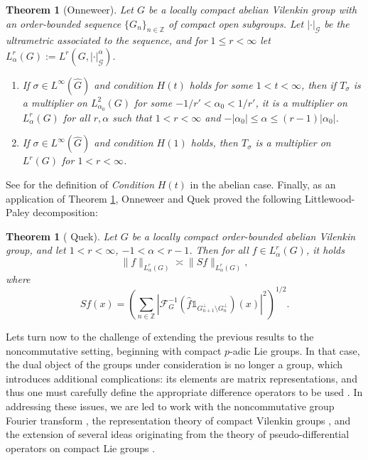 \documentclass[12pt, reqno]{amsart}
\newtheorem{teo}[defi]{Theorem}
\newcommand{\1}{\mathds{1}}
\begin{document}
\begin{teo}[Onneweer]\label{teomiltionnewer}
Let $G$ be a locally compact abelian Vilenkin group with an order-bounded sequence $\{G_n\}_{n \in \mathbb{Z}}$ of compact open subgroups. Let $|\cdot|_{\mathcal{G}}$ be the ultrametric associated to the sequence, and for $1 \le r < \infty$ let $L^r_\alpha(G) := L^r(G, |\cdot|^\alpha_{\mathcal{G}})$.
\begin{enumerate}
    \item If $\sigma \in L^\infty(\hat{G})$ and condition $H(t)$ holds for some $1 < t < \infty$, then if $T_\sigma$ is a multiplier on $L^2_{\alpha_0}(G)$ for some $-1/r' < \alpha_0 < 1/r'$, it is a multiplier on $L^r_\alpha(G)$ for all $r, \alpha$ such that $1 < r < \infty$ and $-|\alpha_0| \le \alpha \le (r-1)|\alpha_0|$.
    \item If $\sigma \in L^\infty(\hat{G})$ and condition $H(1)$ holds, then $T_\sigma$ is a multiplier on $L^r(G)$ for $1 < r < \infty$.
\end{enumerate}
\end{teo}

See \cite{Onneweer1985} for the definition of \emph{Condition} $H(t)$ in the abelian case. Finally, as an application of Theorem \ref{teomiltionnewer}, Onneweer and Quek proved the following Littlewood-Paley decomposition:

\begin{teo}[ Quek]
Let $G$ be a locally compact order-bounded abelian Vilenkin group, and let $1 < r < \infty$, $-1 < \alpha < r-1$. Then for all $f \in L^r_\alpha(G)$, it holds
\[
\|f\|_{L^r_\alpha(G)} \asymp \|S f\|_{L^r_\alpha(G)},
\]
where
\[
S f(x) = \left( \sum_{n \in \mathbb{Z}} |\mathcal{F}_G^{-1}(\widehat{f} \mathbb{1}_{G_{n+1}^\bot \setminus G_n^\bot})(x)|^2 \right)^{1/2}.
\]
\end{teo}

Lets turn now to the challenge of extending the previous results to the noncommutative setting, beginning with compact $p$-adic Lie groups. In that case, the dual object of the groups under consideration is no longer a group, which introduces additional complications: its elements are matrix representations, and thus one must carefully define the appropriate difference operators to be used \cite{Fischer2015, Fischer2020}. In addressing these issues, we are led to work with the noncommutative group Fourier transform \cite{Ruzhansky2010}, the representation theory of compact Vilenkin groups \cite{Boyarchenko2008, Corwin2004-kz, Howe1977, VelasquezRodriguez2025}, and the extension of several ideas originating from the theory of pseudo-differential operators on compact Lie groups \cite{Ruzhansky2015}.
\end{document}
